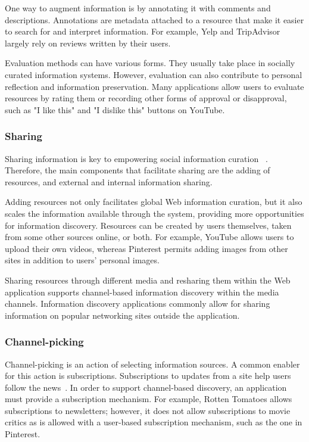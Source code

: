 \documentclass{sigchi}
\newcommand{\feature}[1]{{\ttfamily#1}}
\begin{document}
{{{One way to augment information is by \feature{annotating} it with comments and descriptions. Annotations are metadata attached to a resource that make it easier to search for and interpret information. For example, Yelp and TripAdvisor largely rely on reviews written by their users. 

\feature{Evaluation} methods can have various forms. They usually take place in socially curated information systems. However, evaluation can also contribute to personal reflection and information preservation. Many applications allow users to evaluate resources by rating them or recording other forms of approval or disapproval, such as "I like this" and "I dislike this" buttons on YouTube.
} %

{\subsubsection{Sharing}
Sharing information is key to empowering social information curation ~\cite{beagrie2008digital}. Therefore, the main components that facilitate sharing are the adding of resources, and external and internal information sharing.

\feature{Adding resources} not only facilitates global Web information curation, but it also scales the information available through the system, providing more opportunities for information discovery. Resources can be created by users themselves, taken from some other sources online, or both. For example, YouTube allows users to upload their own videos, whereas Pinterest permits adding images from other sites in addition to users' personal images. 

Sharing resources through different media and resharing them within the Web application supports channel-based information discovery within the media channels. Information discovery applications commonly allow for sharing information on popular networking sites outside the application.
} %
{\subsubsection{Channel-picking}

Channel-picking is an action of selecting information sources. A common enabler for this action is subscriptions. Subscriptions to updates from a site help users follow the news~\cite{java2007feeds}. In order to support channel-based discovery, an application must provide a subscription mechanism. For example, Rotten Tomatoes allows \feature{subscriptions} to \feature{newsletters}; however, it does not allow subscriptions to movie critics as is allowed with a user-based subscription mechanism, such as the one in Pinterest. 

}}}
\end{document}
